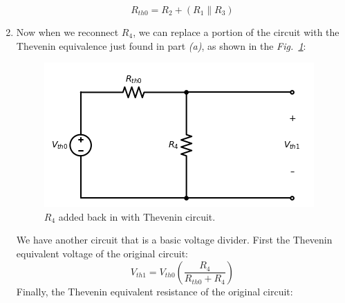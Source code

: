 \documentclass[12pt, fleqn]{article}
\begin{document}
\begin{enumerate}[label=(\alph*)]
{        \begin{equation*}
            \boxed{R_{th0} = R_2 + \left(R_1 \parallel R_3\right)}
        \end{equation*}
        }
    \newpage\noindent
    \item
        {
        Now when we reconnect $R_4$, we can replace a portion of the circuit with the Thevenin equivalence just found in part \textit{(a)}, as shown in the \emph{Fig.~\ref{fig:r4_thev}}:
        \begin{figure}[H]
        \centering
        \includegraphics[scale=0.75]{p1b.png}
        \caption{$R_4$ added back in with Thevenin circuit.}
        \label{fig:r4_thev}
        \end{figure}
        We have another circuit that is a basic voltage divider.  First the Thevenin equivalent voltage of the original circuit:
        \begin{equation*}
            \boxed{V_{th1} = V_{th0} \left(\frac{R_4}{R_{th0} + R_4}\right)}
        \end{equation*}
        \vspace{0.25cm}
        Finally, the Thevenin equivalent resistance of the original circuit:
        
}
\end{enumerate}
\end{document}
